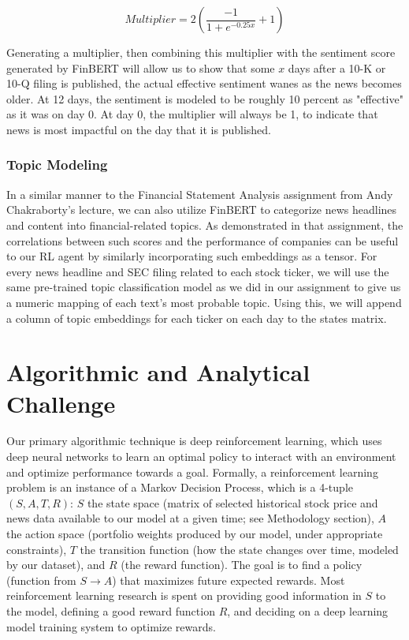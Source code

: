 \begin{equation}
Multiplier = 2\left(\frac{-1}{1+e^{-0.25 x}}+1\right)
\end{equation}

Generating a multiplier, then combining this multiplier with the sentiment score generated by FinBERT will allow us to show that some $x$ days after a 10-K or 10-Q filing is published, the actual effective sentiment wanes as the news becomes older. At 12 days, the sentiment is modeled to be roughly 10 percent as "effective" as it was on day 0. At day 0, the multiplier will always be 1, to indicate that news is most impactful on the day that it is published.

\subsubsection{Topic Modeling}

In a similar manner to the Financial Statement Analysis assignment from 
Andy Chakraborty’s lecture, we can also utilize FinBERT to categorize news 
headlines and content into financial-related topics. As demonstrated in that 
assignment, the correlations between such scores and the performance of 
companies can be useful to our RL agent by similarly incorporating such 
embeddings as a tensor. For every news headline and SEC filing related to 
each stock ticker, we will use the same pre-trained topic classification model 
as we did in our assignment to give us a numeric mapping of each text’s most 
probable topic. Using this, we will append a column of topic embeddings for 
each ticker on each day to the states matrix.

\section{Algorithmic and Analytical Challenge}

Our primary algorithmic technique is deep reinforcement learning, which uses deep neural networks to learn
an optimal policy to interact with an environment and optimize performance towards a goal.
Formally, a reinforcement learning problem is an instance of a Markov 
Decision Process, which is a 4-tuple $(S, A, T, R)$: $S$ the state space 
(matrix of selected historical stock price and news data available to 
our model at a given time; see Methodology section), $A$ the action space 
(portfolio weights produced by our model, under appropriate constraints), 
$T$ the transition function (how the state changes over time, modeled by our dataset), 
and $R$ (the reward function). The goal is to find a policy (function from $S \to A$) 
that maximizes future expected rewards. Most reinforcement learning research is 
spent on providing good information in $S$ to the model, defining a good reward 
function $R$, and deciding on a deep learning model training system to optimize rewards.

